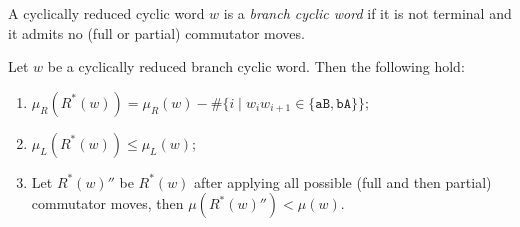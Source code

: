 \documentclass{article}
\begin{document}
	A cyclically reduced cyclic word $w$ is a \emph{branch cyclic word} if it is not terminal and it admits no (full or partial) commutator moves.
	
	\begin{proposition}
		Let $w$ be a cyclically reduced branch cyclic word.
		Then the following hold:
		\begin{enumerate}
			\item $\mu_R(R^*(w))=\mu_R(w)-\#\{i\mid w_iw_{i+1}\in\{\mathtt{aB},\mathtt{bA}\}\}$;
			\item $\mu_L(R^*(w))\le\mu_L(w)$;
			\item Let $R^*(w)''$ be $R^*(w)$ after applying all possible (full and then partial) commutator moves, then $\mu(R^*(w)'')<\mu(w)$.
		\end{enumerate}
	\end{proposition}
\end{document}
